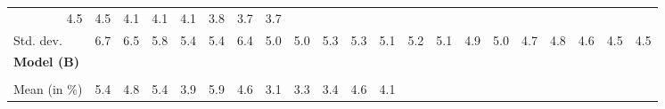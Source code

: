 \begin{tabular}{lllllllllllllllllllll}
  \multicolumn{1}{r}{4.5} &
  \multicolumn{1}{r}{4.5} &
  \multicolumn{1}{r}{4.1} &
  \multicolumn{1}{r}{4.1} &
  \multicolumn{1}{r}{4.1} &
  \multicolumn{1}{r}{3.8} &
  \multicolumn{1}{r}{3.7} &
  \multicolumn{1}{r}{3.7} \\
\multicolumn{1}{l}{\hspace{2em}Std. dev.} &
  \multicolumn{1}{|r}{6.7} &
  \multicolumn{1}{r}{6.5} &
  \multicolumn{1}{r}{5.8} &
  \multicolumn{1}{r}{5.4} &
  \multicolumn{1}{r}{5.4} &
  \multicolumn{1}{r}{6.4} &
  \multicolumn{1}{r}{5.0} &
  \multicolumn{1}{r}{5.0} &
  \multicolumn{1}{r}{5.3} &
  \multicolumn{1}{r}{5.3} &
  \multicolumn{1}{r}{5.1} &
  \multicolumn{1}{r}{5.2} &
  \multicolumn{1}{r}{5.1} &
  \multicolumn{1}{r}{4.9} &
  \multicolumn{1}{r}{5.0} &
  \multicolumn{1}{r}{4.7} &
  \multicolumn{1}{r}{4.8} &
  \multicolumn{1}{r}{4.6} &
  \multicolumn{1}{r}{4.5} &
  \multicolumn{1}{r}{4.5} \\ \hline
\multicolumn{1}{l}{{\textbf{Model (B)}}} &
  \multicolumn{1}{|r}{} &
  \multicolumn{1}{r}{} &
  \multicolumn{1}{r}{} &
  \multicolumn{1}{r}{} &
  \multicolumn{1}{r}{} &
  \multicolumn{1}{r}{} &
  \multicolumn{1}{r}{} &
  \multicolumn{1}{r}{} &
  \multicolumn{1}{r}{} &
  \multicolumn{1}{r}{} &
  \multicolumn{1}{r}{} &
  \multicolumn{1}{r}{} &
  \multicolumn{1}{r}{} &
  \multicolumn{1}{r}{} &
  \multicolumn{1}{r}{} &
  \multicolumn{1}{r}{} &
  \multicolumn{1}{r}{} &
  \multicolumn{1}{r}{} &
  \multicolumn{1}{r}{} &
  \multicolumn{1}{r}{} \\ \hline
\multicolumn{1}{l}{\hspace{1em}{\textit{Multiplicative term} ($\widehat{\tau}^{adv}-1$)}} &
  \multicolumn{1}{|r}{} &
  \multicolumn{1}{r}{} &
  \multicolumn{1}{r}{} &
  \multicolumn{1}{r}{} &
  \multicolumn{1}{r}{} &
  \multicolumn{1}{r}{} &
  \multicolumn{1}{r}{} &
  \multicolumn{1}{r}{} &
  \multicolumn{1}{r}{} &
  \multicolumn{1}{r}{} &
  \multicolumn{1}{r}{} &
  \multicolumn{1}{r}{} &
  \multicolumn{1}{r}{} &
  \multicolumn{1}{r}{} &
  \multicolumn{1}{r}{} &
  \multicolumn{1}{r}{} &
  \multicolumn{1}{r}{} &
  \multicolumn{1}{r}{} &
  \multicolumn{1}{r}{} &
  \multicolumn{1}{r}{} \\
\multicolumn{1}{l}{\hspace{2em}Mean (in $\%$)} &
  \multicolumn{1}{|r}{5.4} &
  \multicolumn{1}{r}{4.8} &
  \multicolumn{1}{r}{5.4} &
  \multicolumn{1}{r}{3.9} &
  \multicolumn{1}{r}{5.9} &
  \multicolumn{1}{r}{4.6} &
  \multicolumn{1}{r}{3.1} &
  \multicolumn{1}{r}{3.3} &
  \multicolumn{1}{r}{3.4} &
  \multicolumn{1}{r}{4.6} &
  \multicolumn{1}{r}{4.1} &

\end{tabular}
